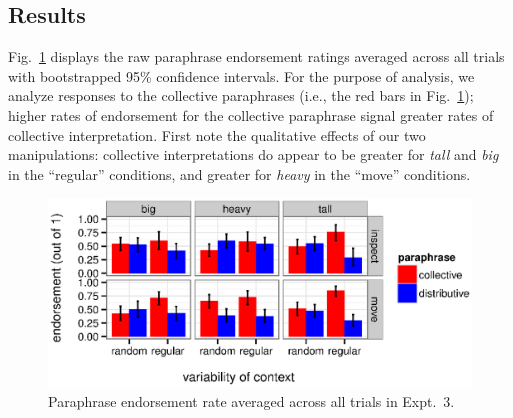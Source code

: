 \documentclass[linguex]{sp}
\newcommand{\ndg}[1]{\textcolor{Green}{[ndg: #1]}}
\begin{document}
\subsection{Results}

Fig.\ \ref{resultsexpt2} displays the raw paraphrase endorsement ratings averaged across all trials with bootstrapped 95\% confidence intervals. For the purpose of analysis, we analyze responses to the collective paraphrases (i.e., the red bars in Fig.~\ref{resultsexpt2}); higher rates of endorsement for the collective paraphrase signal greater rates of collective interpretation. %
First note the qualitative effects of our two manipulations: collective interpretations do appear to be greater for \emph{tall} and \emph{big} in the ``regular'' conditions, and greater for \emph{heavy} in the ``move'' conditions.


\begin{figure}[h!]
	\centering
	\includegraphics[width=.9\linewidth]{plots/expt3.eps} 
	\caption{Paraphrase endorsement rate averaged across all trials in Expt.~3.}\label{resultsexpt2}
\end{figure}
\end{document}
